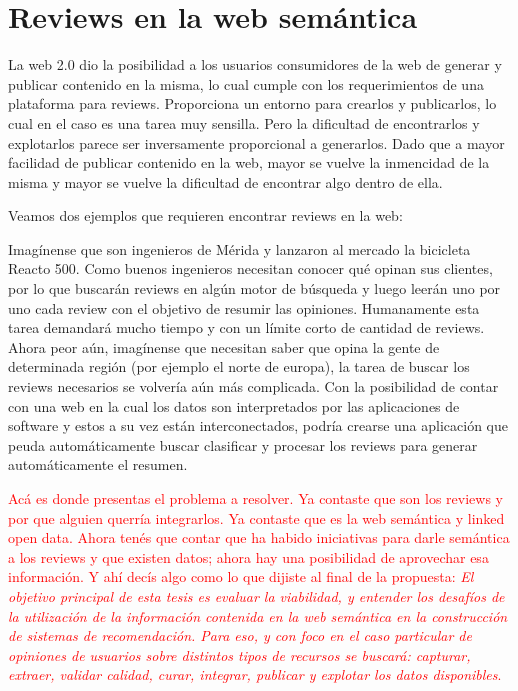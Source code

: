 \section{Reviews en la web semántica}
\label{section:reviews-en-la-web}

La web 2.0 dio la posibilidad a los usuarios consumidores de la web de generar y publicar contenido en la misma, lo cual cumple con los requerimientos de una plataforma para reviews. Proporciona un entorno para crearlos y publicarlos, lo cual en el caso es una tarea muy sensilla. 
Pero la dificultad de encontrarlos y explotarlos parece ser inversamente proporcional a generarlos. Dado que a mayor facilidad de publicar contenido en la web, mayor se vuelve la inmencidad de la misma y mayor se vuelve la dificultad de encontrar algo dentro de ella.

Veamos dos ejemplos que requieren encontrar reviews en la web:

Imagínense que son ingenieros de Mérida y lanzaron al mercado la bicicleta Reacto 500. Como buenos ingenieros necesitan conocer qué opinan sus clientes, por lo que buscarán reviews en algún motor de búsqueda y luego leerán uno por uno cada review con el objetivo de resumir las opiniones. Humanamente esta tarea demandará mucho tiempo y con un límite corto de cantidad de reviews. 
Ahora peor aún, imagínense que necesitan saber que opina la gente de determinada región (por ejemplo el norte de europa), la tarea de buscar los reviews necesarios se volvería aún más complicada.
Con la posibilidad de contar con una web en la cual los datos son interpretados por las aplicaciones de software y estos a su vez están interconectados, podría crearse una aplicación que peuda automáticamente buscar clasificar y procesar los reviews para generar automáticamente el resumen.


\begin{framed}
\textcolor{red}{Acá es donde presentas el problema a resolver. Ya contaste que son los reviews y por que alguien querría integrarlos. Ya contaste que es la web semántica y linked open data. Ahora tenés que contar que ha habido iniciativas para darle semántica a los reviews y que existen datos; ahora hay una posibilidad de aprovechar esa información. Y ahí decís algo como lo que dijiste al final de la propuesta: \textit{El objetivo principal de esta tesis es evaluar la viabilidad, y entender los desafíos de la utilización de la información contenida en la web semántica en la construcción de sistemas de recomendación. Para eso, y con foco en el caso particular de opiniones de usuarios sobre distintos tipos de recursos se buscará: capturar, extraer, validar calidad, curar, integrar, publicar y explotar los datos disponibles}.}
\end{framed}

